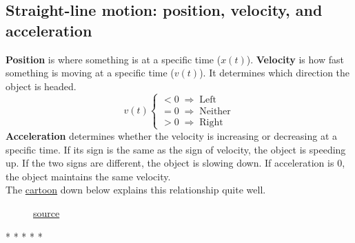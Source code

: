 \documentclass[12pt]{article}
\begin{document}
        \subsection{Straight-line motion: position, velocity, and acceleration}
            \textbf{Position} is where something is at a specific time ($x(t)$).
            \newline
            \textbf{Velocity} is how fast something is moving at a specific time ($v(t)$). It determines which direction the object is headed.
            \[ v(t) \begin{cases}
                <0 \; \Rightarrow \; \text{Left} \\
                =0 \; \Rightarrow \; \text{Neither} \\
                >0 \; \Rightarrow \; \text{Right}
            \end{cases} \]
            \newline
            \textbf{Acceleration} determines whether the velocity is increasing or decreasing at a specific time. If its sign is the same as the sign of velocity, the object is speeding up. If the two signs are different, the object is slowing down. If acceleration is $0$, the object maintains the same velocity.
            \\ The \hyperref[fig:posveloaccel]{cartoon} down below explains this relationship quite well.
            \begin{figure}[H]
                \begin{center}
                    \caption{\href{https://www.khanacademy.org/science/physics/one-dimensional-motion/acceleration-tutorial/a/acceleration-article?modal=1}{source}}
                    \label{fig:posveloaccel}
                \end{center}
            \end{figure}
            \begin{center}
                * * * * *
            \end{center}
\end{document}
